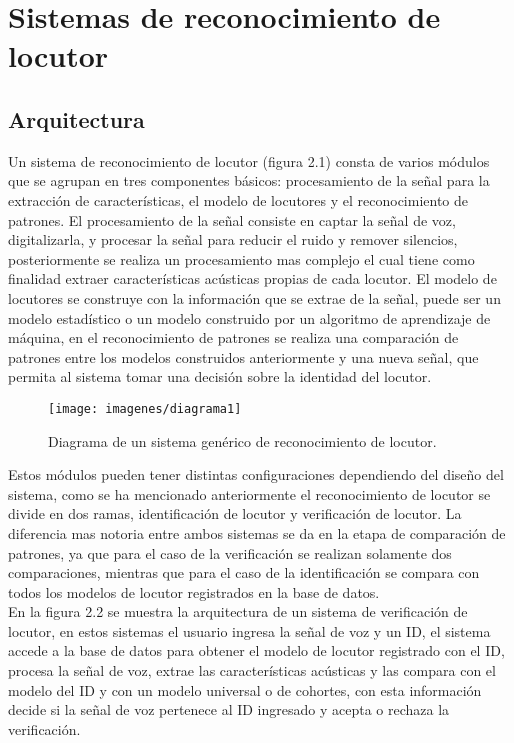 \section{Sistemas de reconocimiento de locutor}

\subsection{Arquitectura}
Un sistema de reconocimiento de locutor (figura 2.1) consta de varios m\'odulos que se agrupan en tres componentes b\'asicos: procesamiento de la señal para la extracci\'on de caracter\'isticas, el modelo de locutores y el reconocimiento de patrones. El procesamiento de la señal consiste en captar la señal de voz, digitalizarla, y procesar la señal para reducir el ruido y remover silencios, posteriormente se realiza un procesamiento mas complejo el cual tiene como finalidad extraer caracter\'isticas ac\'usticas propias de cada locutor. El modelo de locutores se construye con la informaci\'on que se extrae de la señal, puede ser un modelo estad\'istico o un modelo construido por un algoritmo de aprendizaje de m\'aquina, en el reconocimiento de patrones se realiza una comparaci\'on de patrones entre los modelos construidos anteriormente y una nueva señal,  que permita al sistema tomar una decisi\'on sobre la identidad del locutor.\\ 

\begin{figure}[H]
	\begin{center}
	\texttt{[image: imagenes/diagrama1]} \\
	\caption{Diagrama de un sistema gen\'erico de reconocimiento de locutor.}
	\label{fig:diag_recon_locutor}
	\end{center}
\end{figure}

Estos m\'odulos pueden tener distintas configuraciones dependiendo del diseño del sistema, como se ha mencionado anteriormente el reconocimiento de locutor se divide en dos ramas, identificaci\'on de locutor y verificaci\'on de locutor. La diferencia mas notoria entre ambos sistemas se da en la etapa de comparaci\'on de patrones, ya que para el caso de la verificaci\'on se realizan solamente dos comparaciones, mientras que para el caso de la identificaci\'on se compara con todos los modelos de locutor registrados en la base de datos.\\

En la figura 2.2 se muestra la arquitectura de un sistema de verificaci\'on de locutor, en estos sistemas el usuario ingresa la señal de voz y un ID, el sistema accede a la base de datos para obtener el modelo de locutor registrado con el ID, procesa la señal de voz, extrae las caracter\'isticas ac\'usticas y las compara con el modelo del ID y con un modelo universal o de cohortes, con esta informaci\'on decide si la señal de voz pertenece al ID ingresado y acepta o rechaza la verificaci\'on.\\

